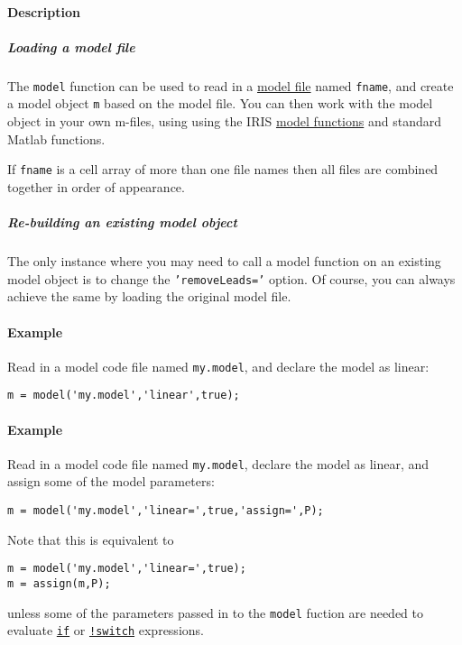\paragraph{Description}\label{description}

\subparagraph{Loading a model file}\label{loading-a-model-file}

The \texttt{model} function can be used to read in a
\href{modellang/Contents}{model file} named \texttt{fname}, and create a
model object \texttt{m} based on the model file. You can then work with
the model object in your own m-files, using using the IRIS
\href{model/Contents}{model functions} and standard Matlab functions.

If \texttt{fname} is a cell array of more than one file names then all
files are combined together in order of appearance.

\subparagraph{Re-building an existing model
object}\label{re-building-an-existing-model-object}

The only instance where you may need to call a model function on an
existing model object is to change the \texttt{'removeLeads='} option.
Of course, you can always achieve the same by loading the original model
file.

\paragraph{Example}\label{example}

Read in a model code file named \texttt{my.model}, and declare the model
as linear:

\begin{verbatim}
m = model('my.model','linear',true);
\end{verbatim}

\paragraph{Example}\label{example-1}

Read in a model code file named \texttt{my.model}, declare the model as
linear, and assign some of the model parameters:

\begin{verbatim}
m = model('my.model','linear=',true,'assign=',P);
\end{verbatim}

Note that this is equivalent to

\begin{verbatim}
m = model('my.model','linear=',true);
m = assign(m,P);
\end{verbatim}

unless some of the parameters passed in to the \texttt{model} fuction
are needed to evaluate \href{modellang/if}{\texttt{if}} or
\href{modellang/switch}{\texttt{!switch}} expressions.


